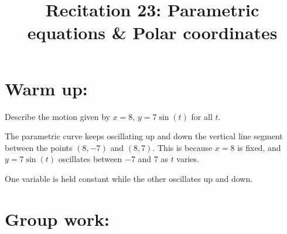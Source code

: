 \documentclass[noinstructornotes]{ximera}
\title{Recitation 23: Parametric equations \& Polar coordinates}
\begin{document}
\begin{abstract}		\end{abstract}
\maketitle




\section{Warm up:}
Describe the motion given by $x=8$, $y=7 \sin (t)$ for all $t$.
	\begin{freeResponse}
	The parametric curve keeps oscillating up and down the vertical line segment between the points $(8,-7)$ and $(8,7)$.
	This is because $x=8$ is fixed, and $y = 7 \sin(t)$ oscillates between $-7$ and $7$ as $t$ varies.
	\end{freeResponse}
	
\begin{instructorNotes}
One variable is held constant while the other oscillates up and down.
\end{instructorNotes}







\section{Group work:}
\end{document}
